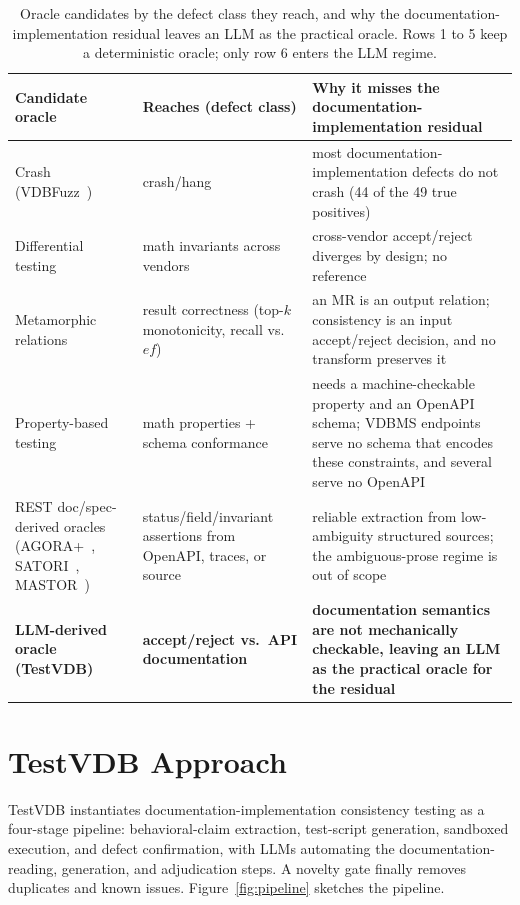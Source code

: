 \documentclass[sigconf]{acmart}
\begin{document}
\begin{table}[t]
\caption{Oracle candidates by the defect class they reach, and why the documentation-implementation residual leaves an LLM as the practical oracle. Rows 1 to 5 keep a deterministic oracle; only row 6 enters the LLM regime.}
\label{tab:exclusion}
\small
\begin{tabular}{@{}p{}p{}p{}@{}}
\toprule
Candidate oracle & Reaches (defect class) & Why it misses the documentation-implementation residual \\
\midrule
Crash (VDBFuzz~\cite{vdbfuzz26}) & crash/hang & most documentation-implementation defects do not crash (44 of the 49 true positives) \\
Differential testing & math invariants across vendors & cross-vendor accept/reject diverges by design; no reference~\cite{roadmap25} \\
Metamorphic relations~\cite{metmap24} & result correctness (top-$k$ monotonicity, recall vs.\ $ef$) & an MR is an output relation; consistency is an input accept/reject decision, and no transform preserves it \\
Property-based testing~\cite{claessen00,schemathesis,quickrest20} & math properties + schema conformance & needs a machine-checkable property and an OpenAPI schema; VDBMS endpoints serve no schema that encodes these constraints, and several serve no OpenAPI \\
REST doc/spec-derived oracles (AGORA+~\cite{agoraplus25}, SATORI~\cite{satori25}, MASTOR~\cite{mastor26}) & status/field/invariant assertions from OpenAPI, traces, or source & reliable extraction from low-ambiguity structured sources; the ambiguous-prose regime is out of scope \\
\textbf{LLM-derived oracle (TestVDB)} & \textbf{accept/reject vs.\ API documentation} & \textbf{documentation semantics are not mechanically checkable, leaving an LLM as the practical oracle for the residual} \\
\bottomrule
\end{tabular}
\end{table}

\section{TestVDB Approach}
\label{sec:approach}

TestVDB instantiates documentation-implementation consistency testing as a four-stage pipeline: behavioral-claim extraction, test-script generation, sandboxed execution, and defect confirmation, with LLMs automating the documentation-reading, generation, and adjudication steps. A novelty gate finally removes duplicates and known issues. Figure~\ref{fig:pipeline} sketches the pipeline.
\end{document}
